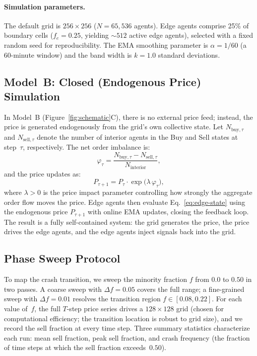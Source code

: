 \documentclass{article}
\theoremstyle{definition}
\theoremstyle{remark}
\begin{document}
\paragraph{Simulation parameters.}
The default grid is $256 \times 256$ ($N = 65{,}536$ agents). Edge agents comprise
25\% of boundary cells ($f_e = 0.25$, yielding ${\sim}512$ active edge agents), selected
with a fixed random seed for reproducibility. The EMA smoothing parameter is
$\alpha = 1/60$ (a 60-minute window) and the band width is $k = 1.0$ standard deviations.

\subsection{Model~B: Closed (Endogenous Price) Simulation}
\label{sec:model-b}
In Model~B (Figure~\ref{fig:schematic}C), there is no external price feed; instead, the
price is generated endogenously from the grid's own collective state. Let
$N_{\text{buy},\tau}$ and $N_{\text{sell},\tau}$ denote the number of interior agents in
the Buy and Sell states at step~$\tau$, respectively. The net order imbalance is:
\begin{equation}
  \varphi_\tau = \frac{N_{\text{buy},\tau} - N_{\text{sell},\tau}}{N_{\text{interior}}},
  \label{eq:imbalance}
\end{equation}
and the price updates as:
\begin{equation}
  P_{\tau+1} = P_\tau \cdot \exp\!\bigl(\lambda\,\varphi_\tau\bigr),
  \label{eq:price-update}
\end{equation}
where $\lambda > 0$ is the price impact parameter controlling how strongly the aggregate
order flow moves the price. Edge agents then evaluate Eq.~\eqref{eq:edge-state} using the
endogenous price $P_{\tau+1}$ with online EMA updates, closing the feedback loop. The
result is a fully self-contained system: the grid generates the price, the price drives the
edge agents, and the edge agents inject signals back into the grid.

\subsection{Phase Sweep Protocol}
\label{sec:phase-sweep}
To map the crash transition, we sweep the minority fraction $f$ from $0.0$ to $0.50$ in
two passes. A coarse sweep with $\Delta f = 0.05$ covers the full range; a fine-grained
sweep with $\Delta f = 0.01$ resolves the transition region $f \in [0.08, 0.22]$.
For each value of~$f$, the full $T$-step price series drives a $128 \times 128$ grid
(chosen for computational efficiency; the transition location is robust to grid size),
and we record the sell fraction at every time step. Three summary statistics characterize
each run: mean sell fraction, peak sell fraction, and crash frequency (the fraction of
time steps at which the sell fraction exceeds~$0.50$).
\end{document}
